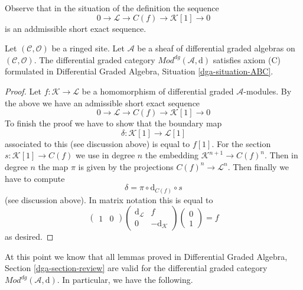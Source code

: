 \noindent
Observe that in the situation of the definition the sequence
$$
0 \to \mathcal{L} \to C(f) \to \mathcal{K}[1] \to 0
$$
is an addmissible short exact sequence.

\begin{lemma}
\label{lemma-axiom-C}
Let $(\mathcal{C}, \mathcal{O})$ be a ringed site.
Let $\mathcal{A}$ be a sheaf of differential graded algebras
on $(\mathcal{C}, \mathcal{O})$.
The differential graded category
$\textit{Mod}^{dg}(\mathcal{A}, \text{d})$
satisfies axiom (C) formulated in
Differential Graded Algebra, Situation \ref{dga-situation-ABC}.
\end{lemma}

\begin{proof}
Let $f : \mathcal{K} \to \mathcal{L}$
be a homomorphism of differential graded $\mathcal{A}$-modules.
By the above we have an admissible short exact sequence
$$
0 \to \mathcal{L} \to C(f) \to \mathcal{K}[1] \to 0
$$
To finish the proof we have to show that the boundary map
$$
\delta : \mathcal{K}[1] \to \mathcal{L}[1]
$$
associated to this (see discussion above) is equal to $f[1]$.
For the section $s : \mathcal{K}[1] \to C(f)$ we use in degree
$n$ the embedding $\mathcal{K}^{n + 1} \to C(f)^n$. Then
in degree $n$ the map $\pi$ is given by the projections
$C(f)^n \to \mathcal{L}^n$. Then finally we have to compute
$$
\delta = \pi \circ \text{d}_{C(f)} \circ s
$$
(see discussion above). In matrix notation this is equal to
$$
\left(
\begin{matrix}
1 & 0
\end{matrix}
\right)
\left(
\begin{matrix}
\text{d}_\mathcal{L} & f \\
0 & -\text{d}_\mathcal{K}
\end{matrix}
\right)
\left(
\begin{matrix}
0 \\
1
\end{matrix}
\right) = f
$$
as desired.
\end{proof}

\noindent
At this point we know that all lemmas proved in
Differential Graded Algebra, Section \ref{dga-section-review}
are valid for the differential graded category
$\textit{Mod}^{dg}(\mathcal{A}, \text{d})$.
In particular, we have the following.

